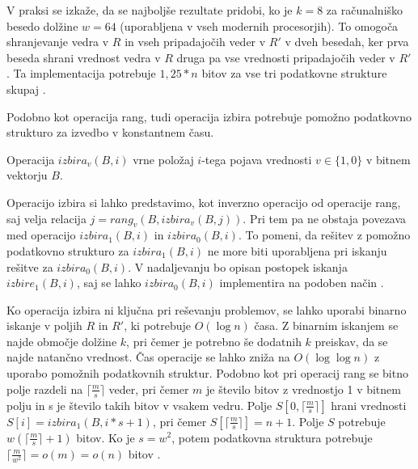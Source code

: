 V praksi se izkaže, da se najboljše rezultate pridobi, ko je $k=8$ za računalniško besedo dolžine $w=64$ (uporabljena v vseh modernih procesorjih). To omogoča shranjevanje vedra v $R$ in vseh pripadajočih veder v $R'$ v dveh besedah, ker prva beseda shrani vrednost vedra v $R$ druga pa vse vrednosti pripadajočih veder v $R'$. Ta implementacija potrebuje $1,25*n$ bitov za vse tri podatkovne strukture skupaj \cite{Navarro2016}.

Podobno kot operacija rang, tudi operacija izbira potrebuje pomožno podatkovno strukturo za izvedbo v konstantnem času. 
\begin{defi}
    Operacija $izbira_v(B,i)$ vrne položaj $i$-tega pojava vrednosti $v\in\{1,0\}$ v bitnem vektorju $B$.
\end{defi}
Operacijo izbira si lahko predstavimo, kot inverzno operacijo od operacije rang, saj velja relacija $j=rang_v(B,izbira_v(B,j))$. Pri tem pa ne obstaja povezava med operacijo $izbira_1(B,i)$ in $izbira_0(B,i)$. To pomeni, da rešitev z pomožno podatkovno strukturo za $izbira_1(B,i)$ ne more biti uporabljena pri iskanju rešitve za $izbira_0(B,i)$. V nadaljevanju bo opisan postopek iskanja $izbire_1(B,i)$, saj se lahko $izbira_0(B,i)$ implementira na podoben način \cite{Navarro2016}.

Ko operacija izbira ni ključna pri reševanju problemov, se lahko uporabi binarno iskanje v poljih $R$ in $R'$, ki potrebuje $O(\log{n})$ časa. Z binarnim iskanjem se najde območje dolžine $k$, pri čemer je potrebno še dodatnih $k$ preiskav, da se najde natančno vrednost.
Čas operacije se lahko zniža na $O(\log\log n)$ z uporabo pomožnih podatkovnih struktur. Podobno kot pri operacij rang se bitno polje razdeli na $\lceil \frac{m}{s} \rceil$ veder, pri čemer $m$ je število bitov z vrednostjo 1 v bitnem polju in s je število takih bitov v vsakem vedru. Polje $S[0,\lceil \frac{m}{s} \rceil]$ hrani vrednosti $S[i]=izbira_1(B,i*s+1)$, pri čemer $S[\lceil \frac{m}{s} \rceil]=n+1$. Polje $S$ potrebuje $w(\lceil \frac{m}{s} \rceil +1)$ bitov. Ko je $s=w^2$, potem podatkovna struktura potrebuje $\lceil\frac{m}{w^2}\rceil=o(m)=o(n)$ bitov \cite{Navarro2016}.

